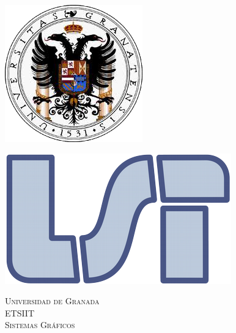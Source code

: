 \documentclass[12zpt]{article}
\begin{document}
\begin{center}																		%
\newcommand{\HRule}{\rule{\linewidth}{0.5mm}}									%
\begin{minipage}{0.48\textwidth} \begin{flushleft}
\includegraphics[scale = 0.42]{logo1.png}
\end{flushleft}\end{minipage}
\begin{minipage}{0.48\textwidth} \begin{flushright}
\includegraphics[scale = 0.35]{logo2.png}
\end{flushright}\end{minipage}

\vspace*{-1.5cm}								%
\textsc{\huge Universidad de Granada\\ \vspace{5px} ETSIIT}\\[1.5cm]	

\textsc{\LARGE Sistemas Gráficos}\\[1.5cm]													%


\end{center}
\end{document}
